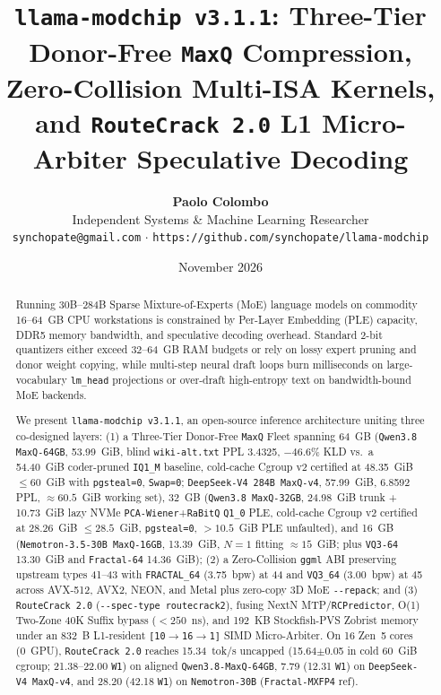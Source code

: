 \documentclass[10pt,twocolumn]{article}
\title{\textbf{\Large \texttt{llama-modchip v3.1.1}: Three-Tier Donor-Free \texttt{MaxQ} Compression, Zero-Collision Multi-ISA Kernels, and \texttt{RouteCrack 2.0} L1 Micro-Arbiter Speculative Decoding}}
\author{
  \textbf{Paolo Colombo} \\
  Independent Systems \& Machine Learning Researcher \\
  \texttt{synchopate@gmail.com} \quad $\cdot$ \quad \texttt{https://github.com/synchopate/llama-modchip}
}
\date{November 2026}
\begin{document}
\maketitle

\begin{abstract}
Running 30B--284B Sparse Mixture-of-Experts (MoE) language models on commodity 16--64~GB CPU workstations is constrained by Per-Layer Embedding (PLE) capacity, DDR5 memory bandwidth, and speculative decoding overhead. Standard 2-bit quantizers either exceed 32--64~GB RAM budgets or rely on lossy expert pruning and donor weight copying, while multi-step neural draft loops burn milliseconds on large-vocabulary \texttt{lm\_head} projections or over-draft high-entropy text on bandwidth-bound MoE backends.

We present \texttt{llama-modchip v3.1.1}, an open-source inference architecture uniting three co-designed layers: (1) a Three-Tier Donor-Free \texttt{MaxQ} Fleet spanning 64~GB (\texttt{Qwen3.8 MaxQ-64GB}, 53.99~GiB, blind \texttt{wiki-alt.txt} PPL 3.4325, $-46.6\%$ KLD vs.\ a 54.40~GiB coder-pruned \texttt{IQ1\_M} baseline, cold-cache Cgroup v2 certified at 48.35~GiB $\le 60$~GiB with \texttt{pgsteal=0}, \texttt{Swap=0}; \texttt{DeepSeek-V4 284B MaxQ-v4}, 57.99~GiB, 6.8592 PPL, $\approx 60.5$~GiB working set), 32~GB (\texttt{Qwen3.8 MaxQ-32GB}, 24.98~GiB trunk + 10.73~GiB lazy NVMe \texttt{PCA-Wiener}+\texttt{RaBitQ} \mbox{\texttt{Q1\_0}} PLE, cold-cache Cgroup v2 certified at 28.26~GiB $\le 28.5$~GiB, \texttt{pgsteal=0}, $>10.5$~GiB PLE unfaulted), and 16~GB (\texttt{Nemotron-3.5-30B MaxQ-16GB}, 13.39~GiB, $N=1$ fitting ${\approx}15$~GiB; plus \texttt{VQ3-64} 13.30~GiB and \texttt{Fractal-64} 14.36~GiB); (2) a Zero-Collision \texttt{ggml} ABI preserving upstream types 41--43 with \texttt{FRACTAL\_64} (3.75~bpw) at 44 and \texttt{VQ3\_64} (3.00~bpw) at 45 across AVX-512, AVX2, NEON, and Metal plus zero-copy 3D MoE \texttt{{-}{-}repack}; and (3) \texttt{RouteCrack 2.0} (\texttt{{-}{-}spec-type routecrack2}), fusing NextN MTP/\texttt{RCPredictor}, O(1) Two-Zone 40K Suffix bypass ($<250$~ns), and 192~KB Stockfish-PVS Zobrist memory under an 832~B L1-resident \texttt{[10$\to$16$\to$1]} SIMD Micro-Arbiter. On 16 Zen~5 cores (0~GPU), \texttt{RouteCrack 2.0} reaches 15.34~tok/s uncapped (15.64$\pm$0.05 in cold 60~GiB cgroup; 21.38--22.00 \texttt{W1}) on aligned \texttt{Qwen3.8-MaxQ-64GB}, 7.79 (12.31 \texttt{W1}) on \texttt{DeepSeek-V4 MaxQ-v4}, and 28.20 (42.18 \texttt{W1}) on \texttt{Nemotron-30B} (\texttt{Fractal-MXFP4} ref).
\end{abstract}
\end{document}
